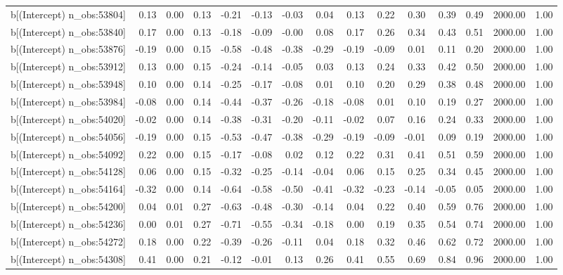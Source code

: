 \begin{table}[ht]
\begin{tabular}{rrrrrrrrrrrrrrr}
  b[(Intercept) n\_obs:53804] & 0.13 & 0.00 & 0.13 & -0.21 & -0.13 & -0.03 & 0.04 & 0.13 & 0.22 & 0.30 & 0.39 & 0.49 & 2000.00 & 1.00 \\ 
  b[(Intercept) n\_obs:53840] & 0.17 & 0.00 & 0.13 & -0.18 & -0.09 & -0.00 & 0.08 & 0.17 & 0.26 & 0.34 & 0.43 & 0.51 & 2000.00 & 1.00 \\ 
  b[(Intercept) n\_obs:53876] & -0.19 & 0.00 & 0.15 & -0.58 & -0.48 & -0.38 & -0.29 & -0.19 & -0.09 & 0.01 & 0.11 & 0.20 & 2000.00 & 1.00 \\ 
  b[(Intercept) n\_obs:53912] & 0.13 & 0.00 & 0.15 & -0.24 & -0.14 & -0.05 & 0.03 & 0.13 & 0.24 & 0.33 & 0.42 & 0.50 & 2000.00 & 1.00 \\ 
  b[(Intercept) n\_obs:53948] & 0.10 & 0.00 & 0.14 & -0.25 & -0.17 & -0.08 & 0.01 & 0.10 & 0.20 & 0.29 & 0.38 & 0.48 & 2000.00 & 1.00 \\ 
  b[(Intercept) n\_obs:53984] & -0.08 & 0.00 & 0.14 & -0.44 & -0.37 & -0.26 & -0.18 & -0.08 & 0.01 & 0.10 & 0.19 & 0.27 & 2000.00 & 1.00 \\ 
  b[(Intercept) n\_obs:54020] & -0.02 & 0.00 & 0.14 & -0.38 & -0.31 & -0.20 & -0.11 & -0.02 & 0.07 & 0.16 & 0.24 & 0.33 & 2000.00 & 1.00 \\ 
  b[(Intercept) n\_obs:54056] & -0.19 & 0.00 & 0.15 & -0.53 & -0.47 & -0.38 & -0.29 & -0.19 & -0.09 & -0.01 & 0.09 & 0.19 & 2000.00 & 1.00 \\ 
  b[(Intercept) n\_obs:54092] & 0.22 & 0.00 & 0.15 & -0.17 & -0.08 & 0.02 & 0.12 & 0.22 & 0.31 & 0.41 & 0.51 & 0.59 & 2000.00 & 1.00 \\ 
  b[(Intercept) n\_obs:54128] & 0.06 & 0.00 & 0.15 & -0.32 & -0.25 & -0.14 & -0.04 & 0.06 & 0.15 & 0.25 & 0.34 & 0.45 & 2000.00 & 1.00 \\ 
  b[(Intercept) n\_obs:54164] & -0.32 & 0.00 & 0.14 & -0.64 & -0.58 & -0.50 & -0.41 & -0.32 & -0.23 & -0.14 & -0.05 & 0.05 & 2000.00 & 1.00 \\ 
  b[(Intercept) n\_obs:54200] & 0.04 & 0.01 & 0.27 & -0.63 & -0.48 & -0.30 & -0.14 & 0.04 & 0.22 & 0.40 & 0.59 & 0.76 & 2000.00 & 1.00 \\ 
  b[(Intercept) n\_obs:54236] & 0.00 & 0.01 & 0.27 & -0.71 & -0.55 & -0.34 & -0.18 & 0.00 & 0.19 & 0.35 & 0.54 & 0.74 & 2000.00 & 1.00 \\ 
  b[(Intercept) n\_obs:54272] & 0.18 & 0.00 & 0.22 & -0.39 & -0.26 & -0.11 & 0.04 & 0.18 & 0.32 & 0.46 & 0.62 & 0.72 & 2000.00 & 1.00 \\ 
  b[(Intercept) n\_obs:54308] & 0.41 & 0.00 & 0.21 & -0.12 & -0.01 & 0.13 & 0.26 & 0.41 & 0.55 & 0.69 & 0.84 & 0.96 & 2000.00 & 1.00 \\ 

\end{tabular}
\end{table}
